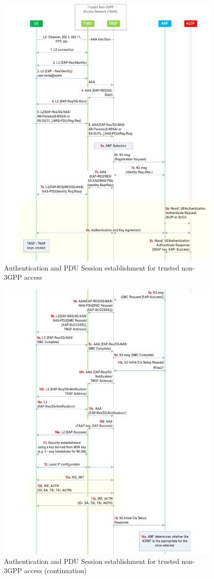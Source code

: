 \begin{figure}
    \centering
    \includegraphics[width=0.75\linewidth]{figs/Authentication and PDU Session establishment for trusted non-3GPP access_1.png}
    \caption{Authentication and \ac{PDU} Session establishment for trusted non-\ac{3GPP} access}
    \label{fig:Authentication and PDU Session establishment for trusted non-3GPP access_1}
\end{figure}

\begin{figure}
    \centering
    \includegraphics[width=0.75\linewidth]{figs/Authentication and PDU Session establishment for trusted non-3GPP access_2.png}
    \caption{Authentication and \ac{PDU} Session establishment for trusted non-\ac{3GPP} access (continuation)}
    \label{fig:Authentication and PDU Session establishment for trusted non-3GPP access_2}
\end{figure}

